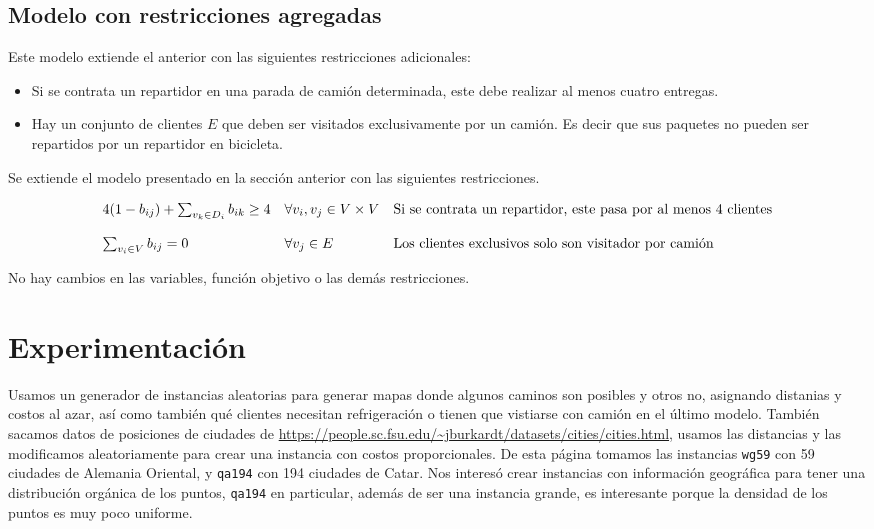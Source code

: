 \documentclass[10pt]{article}
\begin{document}
	\subsection{Modelo con restricciones agregadas}
	Este modelo extiende el anterior con las siguientes restricciones adicionales:
	\begin{itemize}
		\item Si se contrata un repartidor en una parada de camión determinada, este debe realizar al menos cuatro entregas.
		\item Hay un conjunto de clientes $E$ que deben ser visitados exclusivamente por un camión. Es decir que sus paquetes no pueden ser repartidos por un repartidor en bicicleta.
	\end{itemize}
	
	Se extiende el modelo presentado en la sección anterior con las siguientes restricciones.
	
		\[
	\begin{array}{l l l}
		4(1 - b_{ij}) + \sum_{v_k \in D_i} b_{ik} \geq 4 & \forall v_i, v_j \in V \times V & \text{Si se contrata un repartidor, este pasa por al menos 4 clientes} \\
		\\
		\sum_{v_i \in V}  b_{ij} = 0 & \forall v_j \in E  & \text{Los clientes exclusivos solo son visitador por camión} \\
	\end{array}
	\]
	
	No hay cambios en las variables, función objetivo o las demás restricciones.

	\section{Experimentación}

	Usamos un generador de instancias aleatorias para generar mapas donde algunos caminos son posibles y otros no, asignando distanias y costos al azar, así como también qué clientes necesitan refrigeración o tienen que vistiarse con camión en el último modelo. También sacamos datos de posiciones de ciudades de \url{https://people.sc.fsu.edu/~jburkardt/datasets/cities/cities.html}, usamos las distancias y las modificamos aleatoriamente para crear una instancia con costos proporcionales. De esta página tomamos las instancias \texttt{wg59} con 59 ciudades de Alemania Oriental, y \texttt{qa194} con 194 ciudades de Catar. Nos interesó crear instancias con información geográfica para tener una distribución orgánica de los puntos, \texttt{qa194} en particular, además de ser una instancia grande, es interesante porque la densidad de los puntos es muy poco uniforme.
\end{document}
